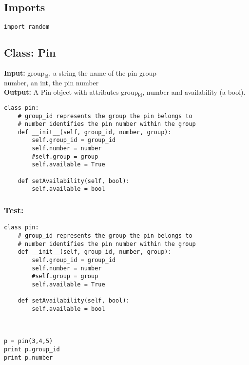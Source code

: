 \documentclass[a4paper]{article}
\begin{document}
\subsection{Imports}
\label{sec-4-1}
\begin{verbatim}
import random
\end{verbatim}
\subsection{Class: Pin}
\label{sec-4-2}
\textbf{Input:} group$_{\text{id}}$, a string the name of the pin group \\
   number, an int, the pin number\\
\textbf{Output:}  A Pin object with attributes group$_{\text{id}}$, number and availability (a bool).

\begin{verbatim}
class pin:
    # group_id represents the group the pin belongs to
    # number identifies the pin number within the group
    def __init__(self, group_id, number, group):
        self.group_id = group_id
        self.number = number
        #self.group = group
        self.available = True

    def setAvailability(self, bool):
        self.available = bool
\end{verbatim}

\subsubsection{Test:}
\label{sec-4-2-1}
\begin{verbatim}
class pin:
    # group_id represents the group the pin belongs to
    # number identifies the pin number within the group
    def __init__(self, group_id, number, group):
        self.group_id = group_id
        self.number = number
        #self.group = group
        self.available = True

    def setAvailability(self, bool):
        self.available = bool



p = pin(3,4,5)
print p.group_id
print p.number
\end{verbatim}
\end{document}

